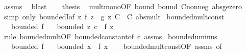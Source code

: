 \begin{isabellebody}
\ assms\ \isamarkupfalse%
\ blast\isanewline
\ \ \isamarkupfalse%
\ {\isacharquery}{\kern0pt}thesis\ \isamarkupfalse%
\ mult{\isacharunderscore}{\kern0pt}mono{\isacharbrackleft}{\kern0pt}OF\ bound\ bound{\isacharprime}{\kern0pt}\ C{\isacharunderscore}{\kern0pt}nonneg\ abs{\isacharunderscore}{\kern0pt}ge{\isacharunderscore}{\kern0pt}zero{\isacharbrackright}{\kern0pt}\ \isamarkupfalse%
\ {\isacharparenleft}{\kern0pt}simp\ only{\isacharcolon}{\kern0pt}\ boundedI{\isacharbrackleft}{\kern0pt}of\ {\isachardoublequoteopen}{\isasymlambda}z{\isachardot}{\kern0pt}\ f\ z\ {\isacharasterisk}{\kern0pt}\ g\ z{\isachardoublequoteclose}\ {\isachardoublequoteopen}C\ {\isacharasterisk}{\kern0pt}\ C{\isacharprime}{\kern0pt}{\isachardoublequoteclose}{\isacharbrackright}{\kern0pt}\ abs{\isacharunderscore}{\kern0pt}mult{\isacharparenright}{\kern0pt}\isanewline
{}\isamarkupfalse%
%
\endisatagproof
{\isafoldproof}%
%
\isadelimproof
\isanewline
%
\endisadelimproof
\isanewline
{}\isamarkupfalse%
\ bounded{\isacharunderscore}{\kern0pt}mult{\isacharunderscore}{\kern0pt}const{\isacharcolon}{\kern0pt}\isanewline
\ \ \ {\isachardoublequoteopen}bounded\ f{\isachardoublequoteclose}\isanewline
\ \ \ {\isachardoublequoteopen}bounded\ {\isacharparenleft}{\kern0pt}{\isasymlambda}z{\isachardot}{\kern0pt}\ c\ {\isacharasterisk}{\kern0pt}\ f\ z{\isacharparenright}{\kern0pt}{\isachardoublequoteclose}\isanewline
%
\isadelimproof
\ \ %
\endisadelimproof
%
\isatagproof
{}\isamarkupfalse%
\ {\isacharparenleft}{\kern0pt}rule\ bounded{\isacharunderscore}{\kern0pt}mult{\isacharbrackleft}{\kern0pt}OF\ bounded{\isacharunderscore}{\kern0pt}constant{\isacharbrackleft}{\kern0pt}of\ c{\isacharbrackright}{\kern0pt}\ assms{\isacharbrackright}{\kern0pt}{\isacharparenright}{\kern0pt}%
\endisatagproof
{\isafoldproof}%
%
\isadelimproof
\isanewline
%
\endisadelimproof
\isanewline
{}\isamarkupfalse%
\ bounded{\isacharunderscore}{\kern0pt}uminus{\isacharcolon}{\kern0pt}\isanewline
\ \ \ {\isachardoublequoteopen}bounded\ f{\isachardoublequoteclose}\isanewline
\ \ \ {\isachardoublequoteopen}bounded\ {\isacharparenleft}{\kern0pt}{\isasymlambda}x{\isachardot}{\kern0pt}\ {\isacharminus}{\kern0pt}\ f\ x{\isacharparenright}{\kern0pt}{\isachardoublequoteclose}\isanewline
%
\isadelimproof
\ \ %
\endisadelimproof
%
\isatagproof
{}\isamarkupfalse%
\ bounded{\isacharunderscore}{\kern0pt}mult{\isacharunderscore}{\kern0pt}const{\isacharbrackleft}{\kern0pt}OF\ assms{\isacharcomma}{\kern0pt}\ of\ {\isachardoublequoteopen}{\isacharminus}{\kern0pt}\ {}{\isachardoublequoteclose}{\isacharbrackright}{\kern0pt}\ \isamarkupfalse%

\end{isabellebody}

